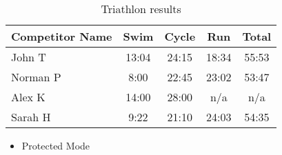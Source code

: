 \documentclass{beamer}
\begin{document}
\begin{frame}
\begin{table}
\begin{tabular}{l | c | c | c | c }
Competitor Name & Swim & Cycle & Run & Total \\
\hline \hline
John T & 13:04 & 24:15 & 18:34 & 55:53 \\ 
Norman P & 8:00 & 22:45 & 23:02 & 53:47\\
Alex K & 14:00 & 28:00 & n/a & n/a\\
Sarah H & 9:22 & 21:10 & 24:03 & 54:35 
\end{tabular}
\caption{Triathlon results}
\end{table}
\end{frame}

\begin{frame}
\begin{itemize}
 \item Protected Mode
\end{itemize}
 
\end{frame}
\end{document}
